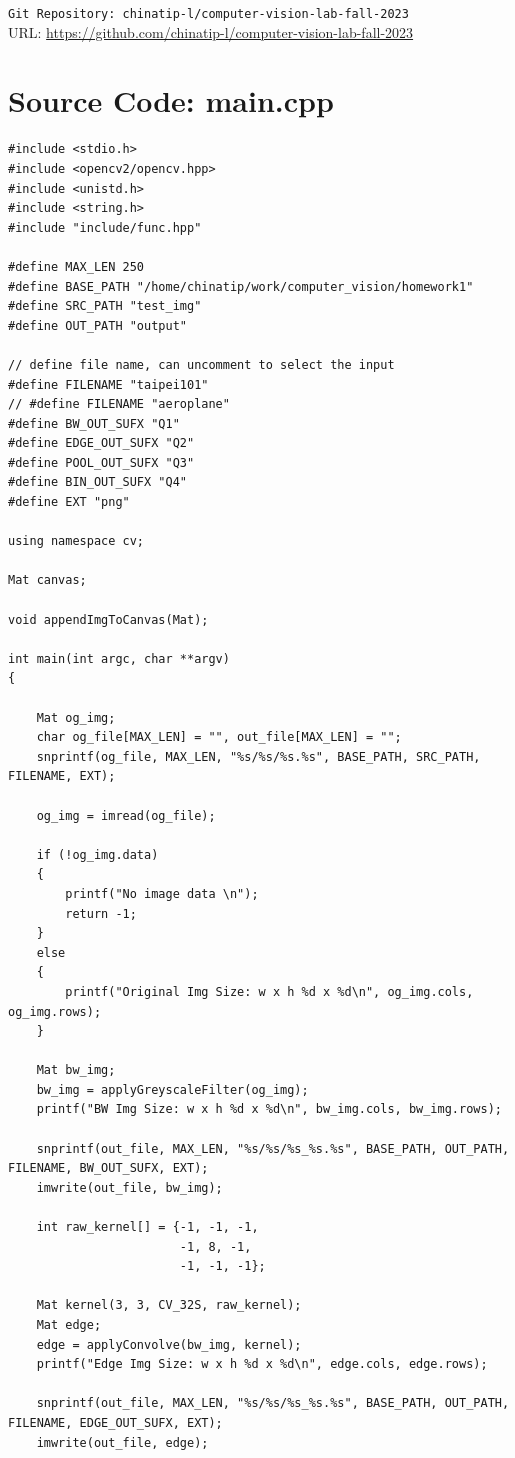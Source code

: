 \documentclass[12pt,a4paper]{report}
\begin{document}
\verb|Git Repository: chinatip-l/computer-vision-lab-fall-2023| \\
URL: \url{https://github.com/chinatip-l/computer-vision-lab-fall-2023}

\chapter{Source Code: main.cpp}
\begin{lstlisting}
#include <stdio.h>
#include <opencv2/opencv.hpp>
#include <unistd.h>
#include <string.h>
#include "include/func.hpp"

#define MAX_LEN 250
#define BASE_PATH "/home/chinatip/work/computer_vision/homework1"
#define SRC_PATH "test_img"
#define OUT_PATH "output"

// define file name, can uncomment to select the input
#define FILENAME "taipei101"
// #define FILENAME "aeroplane"
#define BW_OUT_SUFX "Q1"
#define EDGE_OUT_SUFX "Q2"
#define POOL_OUT_SUFX "Q3"
#define BIN_OUT_SUFX "Q4"
#define EXT "png"

using namespace cv;

Mat canvas;

void appendImgToCanvas(Mat);

int main(int argc, char **argv)
{

    Mat og_img;
    char og_file[MAX_LEN] = "", out_file[MAX_LEN] = "";
    snprintf(og_file, MAX_LEN, "%s/%s/%s.%s", BASE_PATH, SRC_PATH, FILENAME, EXT);

    og_img = imread(og_file);

    if (!og_img.data)
    {
        printf("No image data \n");
        return -1;
    }
    else
    {
        printf("Original Img Size: w x h %d x %d\n", og_img.cols, og_img.rows);
    }

    Mat bw_img;
    bw_img = applyGreyscaleFilter(og_img);
    printf("BW Img Size: w x h %d x %d\n", bw_img.cols, bw_img.rows);

    snprintf(out_file, MAX_LEN, "%s/%s/%s_%s.%s", BASE_PATH, OUT_PATH, FILENAME, BW_OUT_SUFX, EXT);
    imwrite(out_file, bw_img);

    int raw_kernel[] = {-1, -1, -1,
                        -1, 8, -1,
                        -1, -1, -1};

    Mat kernel(3, 3, CV_32S, raw_kernel);
    Mat edge;
    edge = applyConvolve(bw_img, kernel);
    printf("Edge Img Size: w x h %d x %d\n", edge.cols, edge.rows);

    snprintf(out_file, MAX_LEN, "%s/%s/%s_%s.%s", BASE_PATH, OUT_PATH, FILENAME, EDGE_OUT_SUFX, EXT);
    imwrite(out_file, edge);


\end{lstlisting}
\end{document}
